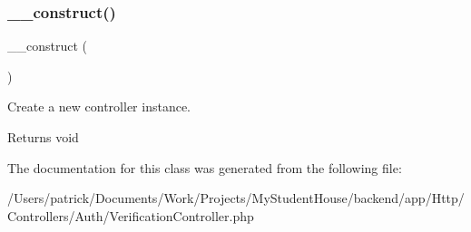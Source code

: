 \subsubsection{\texorpdfstring{\_\_construct()}{\_\_construct()}}
{\footnotesize\ttfamily \+\_\+\+\_\+construct (\begin{DoxyParamCaption}{ }\end{DoxyParamCaption})}

Create a new controller instance.

\begin{DoxyReturn}{Returns}
void 
\end{DoxyReturn}


The documentation for this class was generated from the following file\+:\begin{DoxyCompactItemize}
\item 
/\+Users/patrick/\+Documents/\+Work/\+Projects/\+My\+Student\+House/backend/app/\+Http/\+Controllers/\+Auth/Verification\+Controller.\+php\end{DoxyCompactItemize}

